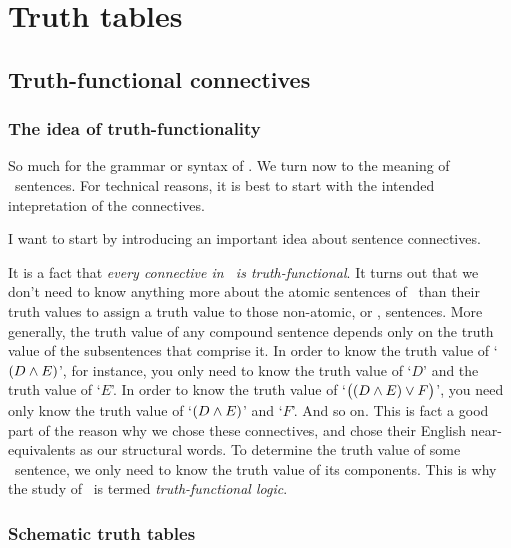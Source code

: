 \part{Truth tables}
\label{ch.TruthTables}

 


\chapter{Truth-functional connectives}\label{s:TruthFunctionality}

\section{The idea of truth-functionality}
So much for the grammar or syntax of \TFL. We turn now to the meaning of \TFL\ sentences. For technical reasons, it is best to  start with the intended intepretation of the connectives. 

I want to start by introducing an important idea about sentence connectives.

It is a fact that \emph{every connective in \TFL\ is truth-functional}. It turns out that we don't need to know anything more about the atomic sentences of \TFL\ than their truth values to assign a truth value to those non-atomic, or , sentences. More generally, the truth value of any compound sentence depends only on the truth value of the subsentences that comprise it. In order to know the truth value of `$(D \wedge E)$', for instance, you only need to know the truth value of `$D$' and the truth value of `$E$'. In order to know the truth value of `$\bigl( (D \wedge E) \vee F\bigr)$', you need only know the truth value of `$(D \wedge E)$' and `$F$'. And so on. This is fact a good part of the reason why we chose these connectives, and chose their English near-equivalents as our structural words. To determine the truth value of some \TFL\ sentence, we only need to know the truth value of its components. This is why the study of \TFL\ is termed \emph{truth-functional logic}.

\section{Schematic truth tables}\label{s:SchematicTruthTables}

